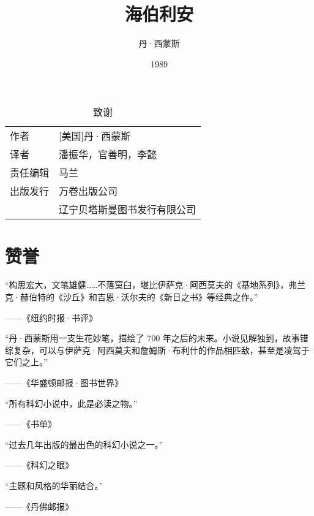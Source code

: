 \documentclass[AutoFakeBold=true]{book}
\title{海伯利安}
\author{丹·西蒙斯}
\date{1989}
\newenvironment{abstract}{}{}
\begin{document}
\maketitle
\pagestyle{empty}

\renewcommand{\abstractname}{}
\begin{abstract}
	\begin{table}[]
		\begin{center}
			\caption{致谢}
			\begin{tabular}{ll}
				{\heiti 作者} & [美国]丹·西蒙斯\\
				{\heiti 译者} & 潘振华，官善明，李懿\\
				{\heiti 责任编辑} & 马兰\\
				{\heiti 出版发行} & 万卷出版公司\\&辽宁贝塔斯曼图书发行有限公司\\
			\end{tabular}
		\end{center}
	\end{table}
\end{abstract}

\section*{赞誉}

``构思宏大，文笔雄健……不落窠臼，堪比伊萨克·阿西莫夫的《基地系列》，弗兰克·赫伯特的《沙丘》和吉恩·沃尔夫的《新日之书》等经典之作。''\begin{flushright}——《纽约时报·书评》\end{flushright}

``丹·西蒙斯用一支生花妙笔，描绘了 700 年之后的未来。小说见解独到，故事错综复杂，可以与伊萨克·阿西莫夫和詹姆斯·布利什的作品相匹敌，甚至是凌驾于它们之上。''\begin{flushright}——《华盛顿邮报·图书世界》\end{flushright}

``所有科幻小说中，此是必读之物。''\begin{flushright}——《书单》\end{flushright}

``过去几年出版的最出色的科幻小说之一。''\begin{flushright}——《科幻之眼》\end{flushright}

``主题和风格的华丽结合。''\begin{flushright}——《丹佛邮报》\end{flushright}
\end{document}
